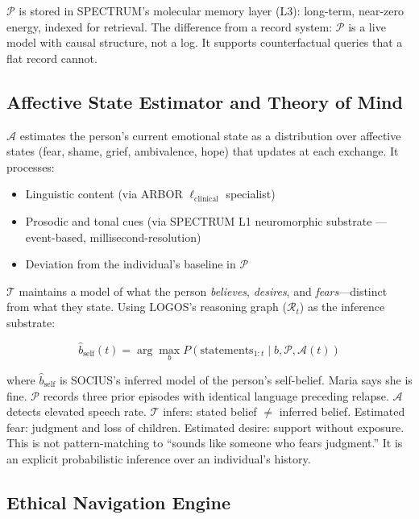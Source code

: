 \documentclass[12pt]{article}
\begin{document}
$\mathcal{P}$ is stored in SPECTRUM's molecular memory layer (L3): long-term, near-zero energy, indexed for retrieval. The difference from a record system: $\mathcal{P}$ is a live model with causal structure, not a log. It supports counterfactual queries that a flat record cannot.

\subsection{Affective State Estimator and Theory of Mind}

$\mathcal{A}$ estimates the person's current emotional state as a distribution over affective states (fear, shame, grief, ambivalence, hope) that updates at each exchange. It processes:
\begin{itemize}
    \item Linguistic content (via ARBOR $\ell_{\text{clinical}}$ specialist)
    \item Prosodic and tonal cues (via SPECTRUM L1 neuromorphic substrate --- event-based, millisecond-resolution)
    \item Deviation from the individual's baseline in $\mathcal{P}$
\end{itemize}

$\mathcal{T}$ maintains a model of what the person \textit{believes}, \textit{desires}, and \textit{fears}---distinct from what they state. Using LOGOS's reasoning graph ($\mathcal{R}_t$) as the inference substrate:

\begin{equation}
\hat{b}_{\text{self}}(t) = \arg\max_{b} P(\text{statements}_{1:t} \mid b, \mathcal{P}, \mathcal{A}(t))
\end{equation}

where $\hat{b}_{\text{self}}$ is SOCIUS's inferred model of the person's self-belief. Maria says she is fine. $\mathcal{P}$ records three prior episodes with identical language preceding relapse. $\mathcal{A}$ detects elevated speech rate. $\mathcal{T}$ infers: stated belief $\neq$ inferred belief. Estimated fear: judgment and loss of children. Estimated desire: support without exposure. This is not pattern-matching to ``sounds like someone who fears judgment.'' It is an explicit probabilistic inference over an individual's history.

\subsection{Ethical Navigation Engine}
\end{document}
